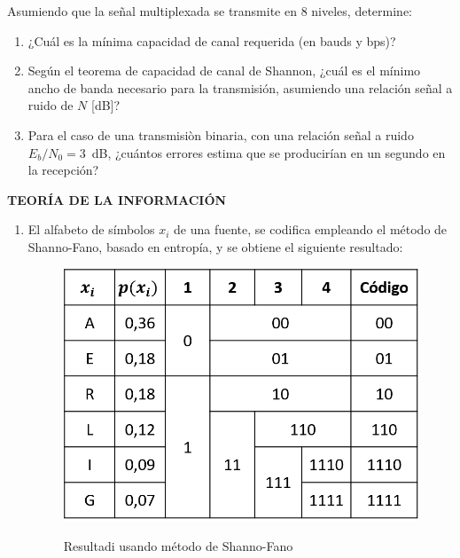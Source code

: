 \begin{enumerate}
\begin{enumerate}
Asumiendo que la señal multiplexada se transmite en 8 niveles, determine: 
\begin{enumerate}
	\item ¿Cuál es la mínima capacidad de canal requerida (en bauds y bps)?
	
	\item Según el teorema de capacidad de canal de Shannon, ¿cuál es el mínimo ancho de banda necesario para la transmisión, asumiendo una relación señal a ruido de $N$ [dB]?
	
	\item Para el caso de una transmisiòn binaria, con una relación señal a ruido $E_b/N_0=3$~dB, ¿cuántos errores estima que se producirían en un segundo en la recepción?
\end{enumerate}
\end{enumerate}




\newpage
\begin{center}
	\textbf{TEORÍA DE LA INFORMACIÓN}
	\\
\end{center}


\begin{enumerate}
	\item El alfabeto de símbolos $x_i$ de una fuente, se codifica empleando el método de Shanno-Fano, basado en entropí­a, y se obtiene el siguiente resultado:

\begin{figure}[h!]
	\captionsetup{justification = raggedright, singlelinecheck = false}
	\caption{Resultadi usando método de Shanno-Fano} 
	\centering
	\includegraphics[scale=0.4]{Imagenes/shannonfano.png}
	\label{fig:shannonfano}
\end{figure}


\end{enumerate}
\end{enumerate}
